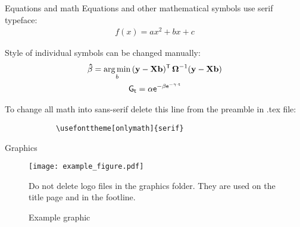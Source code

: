 \documentclass[11pt,t]{beamer}
\begin{document}
	\begin{frame}[fragile]{Equations and math}   %
		Equations and other mathematical symbols use serif typeface:
		\begin{gather*}
			f(x)= a x^2 + b x + c
		\end{gather*}

		Style of individual symbols can be changed manually:
		\begin{gather*}
			\mathbf{\hat{\beta}} = \underset{b}{\rm arg\,min}\,(\mathbf{y}- \mathbf{X} \mathbf{b})^{\mathsf{T}}\,\boldsymbol{\Omega}^{-1}(\mathbf{y}- \mathbf{X} \mathbf{b}) \\
			\mathsf{    G_t = \alpha e^{-\beta e^{-\gamma \cdot t}}    }
		\end{gather*}

		To change all math into sans-serif delete this line from the preamble in .tex file:
		\begin{verbatim}
			\usefonttheme[onlymath]{serif}
		\end{verbatim}
	\end{frame}




	\begin{frame}{Graphics}
		\vspace{-12pt}
		\begin{figure}
			\centering
			\texttt{[image: example\_figure.pdf]}
			\caption{Example graphic \label{fig:figure1}}
			\footnotesize
			\flushleft
			Do not delete logo files in the graphics folder. They are used on the title page and in the footline.
		\end{figure}
	\end{frame}
\end{document}
